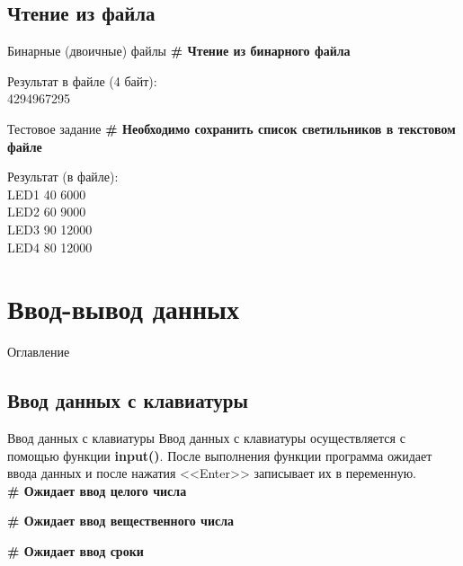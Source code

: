 \documentclass[12pt]{beamer}
\begin{document}
\subsection{Чтение из файла}
\begin{frame}{Бинарные (двоичные) файлы}
\textbf{\# Чтение из бинарного файла} \\
\vspace{0.5cm}

\vspace{0.5cm}
Результат в файле (4 байт): \\
4294967295 \\
\end{frame}


\begin{frame}{Тестовое задание}
\textbf{\# Необходимо сохранить список светильников в текстовом файле} 
\vspace{0.5cm}

\vspace{0.5cm}
Результат (в файле): \\
LED1  40  6000 \\
LED2 60  9000 \\
LED3 90 12000 \\
LED4 80 12000 \\
\end{frame}


\section{Ввод-вывод данных}
\begin{frame}[t]{Оглавление}
\tableofcontents[currentsection]
\end{frame}


\subsection{Ввод данных с клавиатуры}
\begin{frame}{Ввод данных с клавиатуры}
Ввод данных с клавиатуры осуществляется с помощью функции \textbf{input()}. После выполнения  функции программа ожидает ввода данных и после нажатия <<Enter>> записывает их в переменную. \\
\vspace{0.3cm}
\textbf{\# Ожидает ввод целого числа} 

\vspace{0.3cm}
\textbf{\# Ожидает ввод вещественного числа} 

\vspace{0.3cm}
\textbf{\# Ожидает ввод сроки} 

\end{frame}
\end{document}
